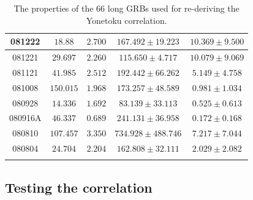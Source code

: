 \begin{longtable}{|c|c|c|c|c|}
\hline
081222 & $   18.88 $ & $ 2.700 $ & $ 167.492 \pm  19.223 $ & $ 10.369 \pm  9.500 $ \\
\hline
081221 & $  29.697 $ & $  2.260 $ & $ 115.650 \pm   4.717 $ & $ 10.079 \pm  9.069 $ \\
\hline
081121 & $  41.985 $ & $ 2.512 $ & $ 192.442 \pm  66.262 $ & $  5.149 \pm  4.758 $ \\
\hline
081008 & $ 150.015 $ & $ 1.968 $ & $ 173.257 \pm  48.589 $ & $  0.981 \pm  1.034 $ \\
\hline
080928 & $  14.336 $ & $ 1.692 $ & $  83.139 \pm  33.113 $ & $  0.525 \pm  0.613 $ \\
\hline
080916A & $  46.337 $ & $ 0.689 $ & $ 241.131 \pm  36.958 $ & $  0.172 \pm  0.168 $ \\
\hline
080810 & $ 107.457 $ & $ 3.350 $ & $ 734.928 \pm 488.746 $ & $  7.217 \pm  7.044 $ \\
\hline
080804 & $  24.704 $ & $ 2.204 $ & $ 162.808 \pm  32.111 $ & $  2.029 \pm  2.082 $ \\
\hline
\caption[Long GRBs used for re-deriving Yonetoku correlation]{The properties of the $66$ long GRBs used for re-deriving the Yonetoku correlation.}
\label{tab:LGRBs_for_Yonetoku_correlation}
\end{longtable}




\subsection{Testing the correlation}

